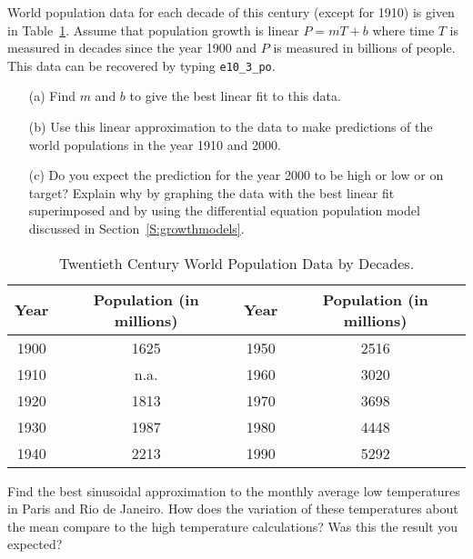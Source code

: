 \documentclass{ximera}
\begin{document}
\EXER

\CEXER

\begin{exercise} \label{c7.6.1}
World population data for each decade of this century (except for 1910)
is given in Table~\ref{T:popdata}.  Assume that population growth is linear
$P=mT+b$ where time $T$ is measured in decades since the year 1900 and $P$ is
measured in billions of people.  This data can be recovered by typing
{\tt e10\_3\_po}.
\begin{itemize}
\item[(a)]  Find $m$ and $b$ to give the best linear fit to this data.
\item[(b)]  Use this linear approximation to the data to make predictions
of the world populations in the year 1910 and 2000.
\item[(c)]  Do you expect the prediction for the year 2000 to be high or low
or on target? Explain why by graphing the data with the best linear fit
superimposed and by using the differential equation population model
discussed in Section~\ref{S:growthmodels}.
\end{itemize}
\begin{table}[htb]
\begin{center}
\begin{tabular}{|c|c||c|c|}
\hline
Year & Population (in millions) & Year & Population (in millions)\\
\hline
1900 & 1625 & 1950 & 2516  \\
1910 & n.a. & 1960 & 3020 \\
1920 & 1813 & 1970 & 3698 \\
1930 & 1987 & 1980 & 4448 \\
1940 & 2213 & 1990 & 5292 \\
\hline
\end{tabular}
\caption{Twentieth Century World Population Data by Decades.}
\label{T:popdata}
\end{center}
\end{table}

\end{exercise}

\begin{exercise} \label{c7.6.2}
Find the best sinusoidal approximation to the monthly average low temperatures
in Paris and Rio de Janeiro.  How does the variation of these temperatures
about the mean compare to the high temperature calculations?  Was this the
result you expected?
\end{exercise}
\end{document}
